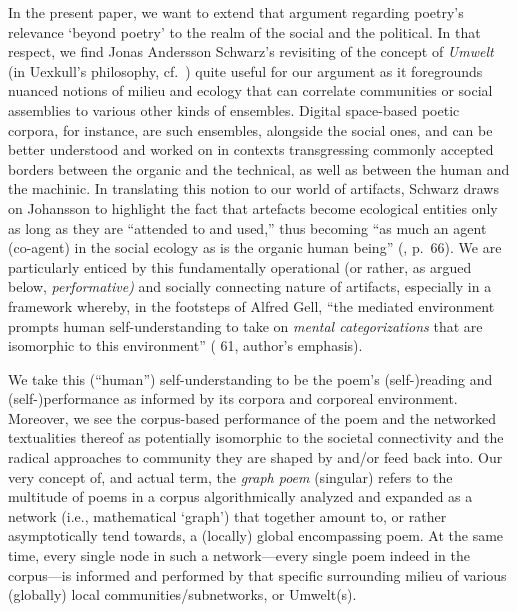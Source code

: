 In the present paper, we want to extend that argument regarding poetry's
relevance `beyond poetry' to the realm of the social and the political.
In that respect, we find Jonas Andersson Schwarz's revisiting of the
concept of \emph{Umwelt} (in Uexkull's philosophy,
cf.~\cite{schwarz2018umwelt}) quite useful for our argument as it
foregrounds nuanced notions of milieu and ecology that can correlate
communities or social assemblies to various other kinds of ensembles.
Digital space-based poetic corpora, for instance, are such ensembles,
alongside the social ones, and can be better understood and worked on in
contexts transgressing commonly accepted borders between the organic and
the technical, as well as between the human and the machinic. In
translating this notion to our world of artifacts, Schwarz draws on
Johansson to highlight the fact that artefacts become ecological
entities only as long as they are ``attended to and used,'' thus
becoming ``as much an agent (co-agent) in the social ecology as is the
organic human being'' (\cite{schwarz2018umwelt}, p.~66). We are
particularly enticed by this fundamentally operational (or rather, as
argued below, \emph{performative)} and socially connecting nature of
artifacts, especially in a framework whereby, in the footsteps of Alfred
Gell, ``the mediated environment prompts human self-understanding to
take on \emph{mental categorizations} that are isomorphic to this
environment'' (\cite{schwarz2018umwelt} 61, author's emphasis).

We take this (``human'') self-understanding to be the poem's
(self-)reading and (self-)performance as informed by its corpora and
corporeal environment. Moreover, we see the corpus-based performance of
the poem and the networked textualities thereof as potentially
isomorphic to the societal connectivity and the radical approaches to
community they are shaped by and/or feed back into. Our very concept of,
and actual term, the \emph{graph poem} (singular) refers to the
multitude of poems in a corpus algorithmically analyzed and expanded as
a network (i.e., mathematical `graph') that together amount to, or
rather asymptotically tend towards, a (locally) global encompassing
poem. At the same time, every single node in such a network---every
single poem indeed in the corpus---is informed and performed by that
specific surrounding milieu of various (globally) local
communities/subnetworks, or Umwelt(s).

